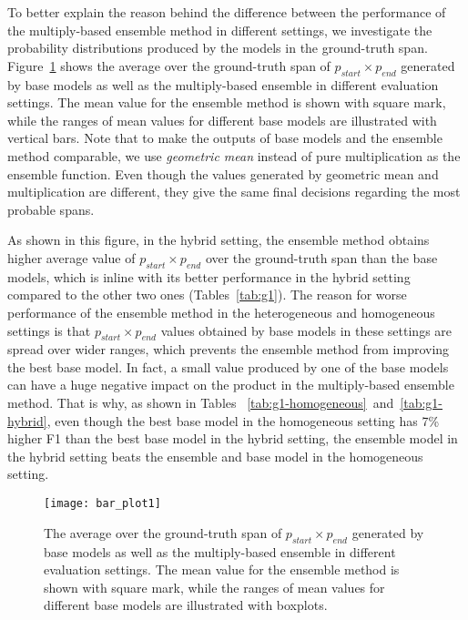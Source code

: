 \documentclass[review]{elsarticle}
\begin{document}
To better explain the reason behind the difference between the performance of the multiply-based ensemble method in different settings, we investigate the probability distributions produced by the models in the ground-truth span. Figure~\ref{fig:multiply_analysis} shows the average over the ground-truth span of $p_{start}\times p_{end}$ generated by base models as well as the multiply-based ensemble in different evaluation settings. The mean value for the ensemble method is shown with square mark, while the ranges of mean values for different base models are illustrated with vertical bars. Note that to make the outputs of base models and the ensemble method comparable, we use \textit{geometric mean} instead of pure multiplication as the ensemble function. Even though the values generated by geometric mean and multiplication are different, they give the same final decisions regarding the most probable spans.

As shown in this figure, in the hybrid setting, the ensemble method obtains higher average value of $p_{start}\times p_{end}$ over the ground-truth span than the base models, which is inline with its better performance in the hybrid setting compared to the other two ones (Tables~\ref{tab:g1}). The reason for worse performance of the ensemble method in the heterogeneous and homogeneous settings is that $p_{start}\times p_{end}$ values obtained by base models in these settings are spread over wider ranges, which prevents the ensemble method from improving the best base model. In fact, a small value produced by one of the base models can have a huge negative impact on the product in the multiply-based ensemble method. That is why, as shown in Tables ~\ref{tab:g1-homogeneous}~and~\ref{tab:g1-hybrid}, even though the best base model in the homogeneous setting has 7\% higher F1 than the best base model in the hybrid setting, the ensemble model in the hybrid setting beats the ensemble and base model in the homogeneous setting.

\begin{figure}[!ht]
\centering
\vspace{-0.2cm}
\texttt{[image: bar\_plot1]} 
\caption{The average over the ground-truth span of $p_{start}\times p_{end}$ generated by base models as well as the multiply-based ensemble in different evaluation settings. The mean value for the ensemble method is shown with square mark, while the ranges of mean values for different base models are illustrated with boxplots.}
\label{fig:multiply_analysis}
\end{figure}
 
\end{document}
